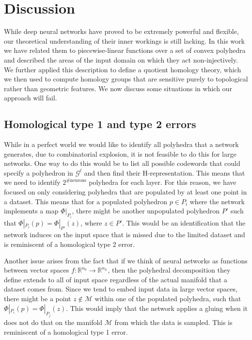 \documentclass[10pt]{article} %
\theoremstyle{plain}
\theoremstyle{definition}
\theoremstyle{remark}
\begin{document}
\section{Discussion}
While deep neural networks have proved to be extremely powerful and flexible, our theoretical understanding of their inner workings is still lacking. In this work we have related them to piecewise-linear functions over a set of convex polyhedra and described the areas of the input domain on which they act non-injectively. We further applied this description to define a quotient homology theory, which we then used to compute homology groups that are sensitive purely to topological rather than geometric features. We now discuss some situations in which our approach will fail.


\subsection{Homological type 1 and type 2 errors}

While in a perfect world we would like to identify all polyhedra that a network generates, due to combinatorial explosion, it is not feasible to do this for large networks. One way to do this would be to list all possible codewords that could specify a polyhedron in $\mathcal{G}^l$ and then find their H-representation. This means that we need to identify $2^{\text{\#neurons}}$ polyhedra for each layer. For this reason, we have focused on only considering polyhedra that are populated by at least one point in a dataset. This means that for a populated polyhedron $p \in P_i$ where the network implements a map $\Phi|_{P_i}$, there might be another unpopulated polyhedron $P'$ such that $\Phi|_{P_i}(p) = \Phi|_{P'}(z)$, where $z \in P'$. This would be an identification that the network induces on the input space that is missed due to the limited dataset and is reminiscent of a homological type 2 error.

Another issue arises from the fact that if we think of neural networks as functions between vector spaces $f:\mathbb{R}^{n_0} \to \mathbb{R}^{n_L}$, then the polyhedral decomposition they define extends to all of input space regardless of the actual manifold that a dataset comes from. Since we tend to embed input data in large vector spaces, there might be a point $z \notin \mathcal{M}$ within one of the populated polyhedra, such that $\Phi|_{P_i}(p) = \Phi|_{P_j}(z)$. This would imply that the network applies a gluing when it does not do that on the manifold $\mathcal{M}$ from which the data is sampled. This is reminiscent of a homological type 1 error.
\end{document}
